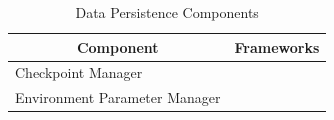 \begin{table}[t]
\centering
\caption{Data Persistence Components}
\vspace{-0.5em}
\label{tab:ra-data-persistence}
\renewcommand{\arraystretch}{0.9}
{\scriptsize
\begin{tabular}{@{}p{2cm}p{6.5cm}@{}}
\toprule
\multicolumn{1}{c}{\textbf{Component}} & \multicolumn{1}{c}{\textbf{Frameworks}} \\ \midrule
Checkpoint Manager & \cite{juliani2020} \cite{bonnet2024jumanji} \cite{stable-baselines3} \cite{rl-zoo3} \cite{liang2018rllib} \cite{hoffman2020acme} \cite{hu2022marllib} \cite{bettini2024benchmarl} \cite{dekock2023mava} \cite{castro18dopamine} \cite{tianshou}\\

Environment Parameter 
Manager & \cite{juliani2020} \cite{makoviychuk2021isaac} \cite{mittal2025isaac} \cite{bellemare2013arcade}\\

\bottomrule
\end{tabular}}
\vspace{-0.75em}
\end{table}